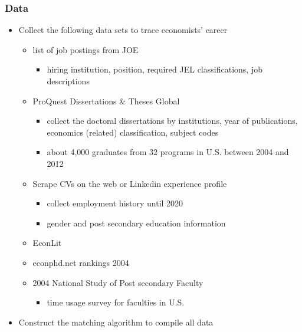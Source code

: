 \documentclass[11pt]{beamer}
\begin{document}
\begin{frame}[label=Data]
	\frametitle{Data}
	\begin{itemize}
		\item Collect the following data sets to trace economists' career
		\begin{itemize}
			\item list of job postings from JOE
			\begin{itemize}
				\item hiring institution, position, required JEL classifications, job descriptions  
			\end{itemize}
			\item ProQuest Dissertations \& Theses Global
			\begin{itemize}
				\item collect the doctoral dissertations by institutions, year of publications, economics (related) classification, subject codes
				\item about 4,000 graduates from 32 programs in U.S. between 2004 and 2012 
			\end{itemize}				
			\item Scrape CVs on the web or Linkedin experience profile
			\begin{itemize}
				\item collect employment history until 2020
				\item gender and post secondary education information
			\end{itemize}
			\item EconLit
			\item econphd.net rankings 2004
			\item 2004 National Study of Post secondary Faculty
			\begin{itemize}
				\item time usage survey for faculties in U.S.
			\end{itemize}
		\end{itemize}
	
		\item Construct the matching algorithm to compile all data  \hyperlink{appendix}{}
	\end{itemize}
\end{frame}
\end{document}
